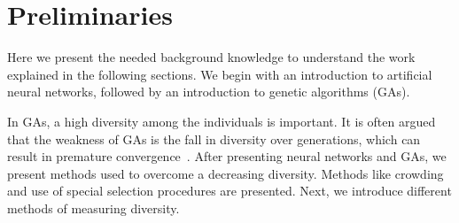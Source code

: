 \section{Preliminaries}
\label{sec:preliminaries}

Here we present the needed background knowledge to understand the work explained in the following sections. We begin with an introduction to artificial neural networks, followed by an introduction to genetic algorithms (GAs). 

In GAs, a high diversity among the individuals is important. It is often argued that the weakness of GAs is the fall in diversity over generations, which can result in premature convergence~\cite{diaz2007empirical, 1266373,Zitzler00comparisonof}. After presenting neural networks and GAs,  we present methods used to overcome a decreasing diversity. Methods like crowding and use of special selection procedures are presented. Next, we introduce different methods of measuring diversity.







